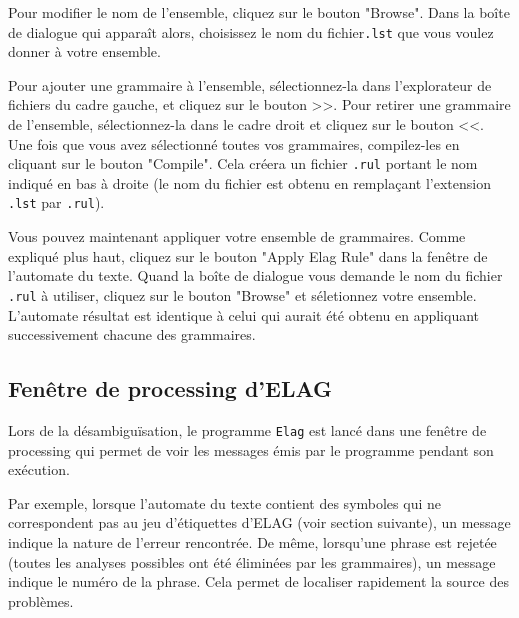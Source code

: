 \bigskip
\noindent Pour modifier le nom de l’ensemble, cliquez sur le bouton "Browse".
Dans la boîte de dialogue qui apparaît alors, choisissez le nom du fichier\verb+.lst+ que vous
voulez donner à votre ensemble.


\bigskip
\noindent Pour ajouter une grammaire à l’ensemble, sélectionnez-la dans l’explorateur de fichiers
du cadre gauche, et cliquez sur le bouton >>.
Pour retirer une grammaire de l’ensemble, sélectionnez-la dans le cadre droit et cliquez
sur le bouton <<.
Une fois que vous avez sélectionné toutes vos grammaires, compilez-les en cliquant sur
le bouton "Compile". Cela créera un fichier \verb+.rul+ portant le nom indiqué en bas à droite (le
	nom du fichier est obtenu en remplaçant l’extension \verb+.lst+ par \verb+.rul+).

\bigskip
\noindent Vous pouvez maintenant appliquer votre ensemble de grammaires. Comme expliqué
plus haut, cliquez sur le bouton "Apply Elag Rule" dans la fenêtre de l’automate du texte. Quand la boîte de dialogue vous demande le nom du fichier \verb+.rul+ à utiliser, cliquez sur le bouton "Browse" et séletionnez votre ensemble. L’automate résultat est identique à celui qui aurait été obtenu en appliquant successivement chacune des grammaires.

\subsection{Fenêtre de processing d’ELAG}
Lors de la désambiguïsation, le programme \verb+Elag+ 
 est lancé dans une fenêtre de processing qui permet
de voir les messages émis par le programme pendant son exécution.


\bigskip
\noindent Par exemple, lorsque l’automate du texte contient des symboles qui ne correspondent
pas au jeu d’étiquettes d’ELAG (voir section suivante), un message indique la nature de l’erreur
rencontrée. De même, lorsqu’une phrase est rejetée (toutes les analyses possibles
ont été éliminées par les grammaires), un message indique le numéro de la phrase. Cela
permet de localiser rapidement la source des problèmes.


